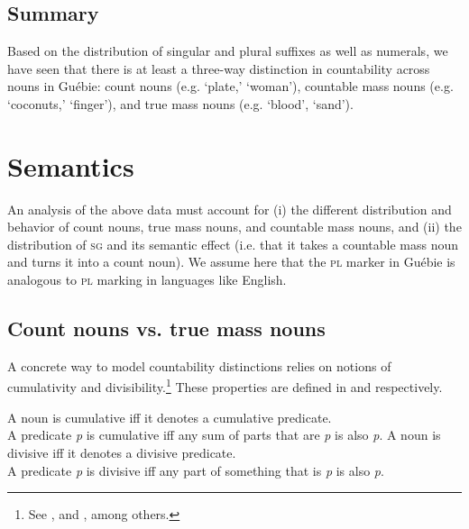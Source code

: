 \documentclass[output=paper,colorlinks,citecolor=brown]{langscibook}
\begin{document}
\subsection{Summary}\label{sec:sande:2.4}

Based on the distribution of singular and plural suffixes as well as numerals, we have seen that there is at least a three-way distinction in countability across nouns in Guébie: count nouns (e.g. `plate,' `woman'), countable mass nouns (e.g. `coconuts,' `finger'), and true mass nouns (e.g. `blood', `sand').

\section{Semantics}\label{sec:sande:3}

An analysis of the above data must account for (i) the different distribution and behavior of count nouns, true mass nouns, and countable mass nouns, and (ii) the distribution of \textsc{sg} and its semantic effect (i.e. that it takes a countable mass noun and turns it into a count noun). We assume here that the \textsc{pl} marker in Guébie is analogous to \textsc{pl} marking in languages like English.

\subsection{Count nouns vs. true mass nouns}\label{sec:sande:3.1}

A concrete way to model countability distinctions relies on notions of cumulativity and divisibility.\footnote{See \citet{Quine1960, Cheng1973, Link1983, Krifka1989, Doetjes1997, Grimm2012Diss}, and \citet{Deal2017}, among others.} These properties are defined in   and  respectively.

\ea%
    \label{ex:sande:13}
    A noun is cumulative iff it denotes a cumulative predicate.\\
    A predicate \textit{p} is cumulative iff any sum of parts that are \textit{p} is also \textit{p}. \hfill{\citep[128]{Deal2017}}
\ex%
    \label{ex:sande:14}
    A noun is divisive iff it denotes a divisive predicate.\\
    A predicate \textit{p} is divisive iff any part of something that is \textit{p} is also \textit{p}. \hfill{\citep[129]{Deal2017}}
\z
\end{document}
